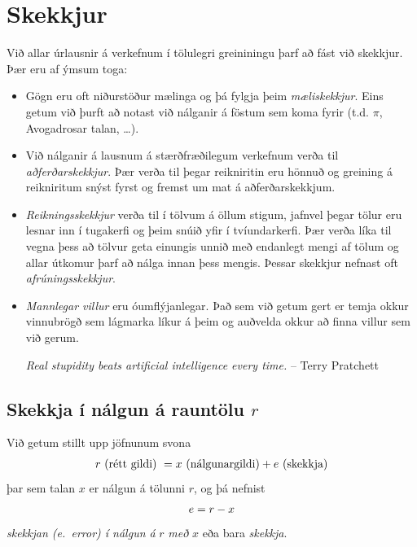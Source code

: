 \documentclass[A4paper,10pt,icelandic]{sphinxmanual}
\begin{document}
\section{Skekkjur}
\label{kafli01:skekkjur}\label{kafli01:index-4}
Við allar úrlausnir á verkefnum í tölulegri greininingu þarf að fást við
skekkjur. Þær eru af ýmsum toga:
\begin{itemize}
\item {} 
Gögn eru oft niðurstöður mælinga og þá fylgja þeim \emph{mæliskekkjur}.
Eins getum við þurft að notast við nálganir á föstum sem koma fyrir
(t.d. \(\pi\), Avogadrosar talan, …).

\item {} 
Við nálganir á lausnum á stærðfræðilegum verkefnum verða til
\emph{aðferðarskekkjur}. Þær verða til þegar reikniritin eru hönnuð og
greining á reikniritum snýst fyrst og fremst um mat á
aðferðarskekkjum.

\item {} 
\emph{Reikningsskekkjur} verða til í tölvum á öllum stigum, jafnvel þegar
tölur eru lesnar inn í tugakerfi og þeim snúið yfir í tvíundarkerfi.
Þær verða líka til vegna þess að tölvur geta einungis unnið með
endanlegt mengi af tölum og allar útkomur þarf að nálga innan þess
mengis. Þessar skekkjur nefnast oft \emph{afrúningsskekkjur}.

\item {} 
\emph{Mannlegar villur} eru óumflýjanlegar. Það sem við getum gert er
temja okkur vinnubrögð sem lágmarka líkur á þeim og auðvelda okkur að
finna villur sem við gerum.

\emph{Real stupidity beats artificial intelligence every time.}
-- Terry Pratchett

\end{itemize}


\subsection{Skekkja í nálgun á rauntölu \(r\)}
\label{kafli01:index-5}\label{kafli01:skekkja-i-nalgun-a-rauntolu}
Við getum stillt upp jöfnunum svona
\begin{gather}
\begin{split}r \text{ (rétt gildi) } = x\text{ (nálgunargildi)} +
    e \text{ (skekkja)}\end{split}\notag
\end{gather}
þar sem talan \(x\) er nálgun á tölunni \(r\), og þá nefnist
\begin{gather}
\begin{split}e=r-x\end{split}\notag
\end{gather}
\emph{skekkjan (e. error) í nálgun á} \(r\) \emph{með} \(x\) eða bara
\emph{skekkja}.
\end{document}
